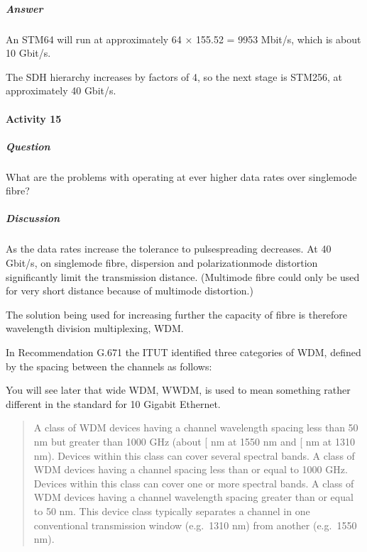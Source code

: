 \documentclass[letterpaper,10pt,english]{sphinxmanual}
\begin{document}
\subparagraph{Answer}
\label{\detokenize{content/session_00/Part_00_04:Answer}}
An STM\sphinxhyphen{}64 will run at approximately 64 × 155.52 = 9953 Mbit/s, which is about 10 Gbit/s.

The SDH hierarchy increases by factors of 4, so the next stage is STM\sphinxhyphen{}256, at approximately 40 Gbit/s.


\paragraph{Activity 15}
\label{\detokenize{content/session_00/Part_00_04:Activity-15}}

\subparagraph{Question}
\label{\detokenize{content/session_00/Part_00_04:id1}}
What are the problems with operating at ever higher data rates over single\sphinxhyphen{}mode fibre?


\subparagraph{Discussion}
\label{\detokenize{content/session_00/Part_00_04:Discussion}}
As the data rates increase the tolerance to pulse\sphinxhyphen{}spreading decreases. At 40 Gbit/s, on single\sphinxhyphen{}mode fibre, dispersion and polarization\sphinxhyphen{}mode distortion significantly limit the transmission distance. (Multimode fibre could only be used for very short distance because of multimode distortion.)

The solution being used for increasing further the capacity of fibre is therefore wavelength division multiplexing, WDM.

In Recommendation G.671 the ITU\sphinxhyphen{}T identified three categories of WDM, defined by the spacing between the channels as follows:

You will see later that wide WDM, WWDM, is used to mean something rather different in the standard for 10 Gigabit Ethernet.


\begin{quote}

 A class of WDM devices having a channel wavelength spacing less than 50 nm but greater than 1000 GHz (about {[}\sphinxstyleemphasis{X}{]} nm at 1550 nm and {[}\sphinxstyleemphasis{Y}{]} nm at 1310 nm). Devices within this class can cover several spectral bands.  A class of WDM devices having a channel spacing less than or equal to 1000 GHz. Devices within this class can cover one or more spectral bands.  A class of WDM devices
having a channel wavelength spacing greater than or equal to 50 nm. This device class typically separates a channel in one conventional transmission window (e.g. 1310 nm) from another (e.g. 1550 nm).
\end{quote}
\end{document}

